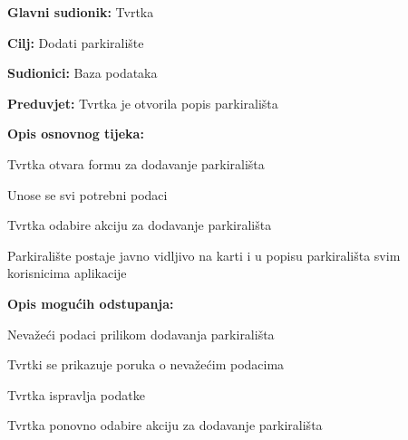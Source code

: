 \noindent {}
\begin{packed_item}

	\item \textbf{Glavni sudionik:} Tvrtka
	\item \textbf{Cilj:} Dodati parkiralište
	\item \textbf{Sudionici:} Baza podataka
	\item \textbf{Preduvjet:} Tvrtka je otvorila popis parkirališta
	\item \textbf{Opis osnovnog tijeka:}
	
	\item[] \begin{packed_enum}
		
		\item Tvrtka otvara formu za dodavanje parkirališta
		\item Unose se svi potrebni podaci
		\item Tvrtka odabire akciju za dodavanje parkirališta
		\item Parkiralište postaje javno vidljivo na karti i u popisu parkirališta svim korisnicima aplikacije

	\end{packed_enum}
	
	\item  \textbf{Opis mogućih odstupanja:}
	
	\item[] \begin{packed_item}
		
		\item[6.a] Nevažeći podaci prilikom dodavanja parkirališta
		\item[] \begin{packed_enum}
			
			\item Tvrtki se prikazuje poruka o nevažećim podacima
			\item Tvrtka ispravlja podatke
			\item Tvrtka ponovno odabire akciju za dodavanje parkirališta
			
		\end{packed_enum}
		
	\end{packed_item}
\end{packed_item}

\pagebreak

